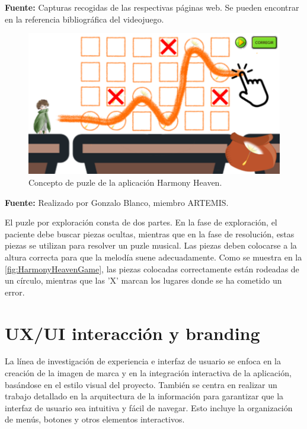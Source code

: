 \begin{center}
	\textbf{Fuente:} Capturas recogidas de las respectivas páginas web. Se pueden encontrar en la referencia bibliográfica del videojuego.
\end{center}

\begin{figure}[h!]
	\centering
	\includegraphics[width=0.7\linewidth]{Figuras/Desarrollo/HarmonyHeaven.png}
	\caption{Concepto de puzle de la aplicación Harmony Heaven.}
	\label{fig:HarmonyHeavenGame}
	\vspace{-30pt}
\end{figure}

\begin{center}
	\textbf{Fuente:} Realizado por Gonzalo Blanco, miembro ARTEMIS.
\end{center}

El puzle por exploración consta de dos partes. En la fase de exploración, el paciente debe buscar piezas ocultas, mientras que en la fase de resolución, estas piezas se utilizan para resolver un puzle musical. Las piezas deben colocarse a la altura correcta para que la melodía suene adecuadamente. Como se muestra en la \autoref{fig:HarmonyHeavenGame}, las piezas colocadas correctamente están rodeadas de un círculo, mientras que las 'X' marcan los lugares donde se ha cometido un error.

\section{UX/UI interacción y branding}

La línea de investigación de experiencia e interfaz de usuario se enfoca en la creación de la imagen de marca y en la integración interactiva de la aplicación, basándose en el estilo visual del proyecto. También se centra en realizar un trabajo detallado en la arquitectura de la información para garantizar que la interfaz de usuario sea intuitiva y fácil de navegar. Esto incluye la organización de menús, botones y otros elementos interactivos.

